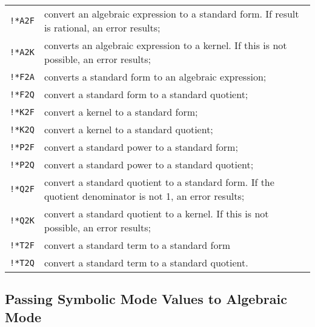 {\renewcommand{\arraystretch}{1.5}
\begin{tabular}{lp{\reduceboxwidth}}
\texttt{!*A2F} & convert an algebraic expression to
a standard form.  If result is rational, an error results; \\
%
\texttt{!*A2K} & converts an algebraic expression to
a kernel.  If this is not possible, an error results; \\
%
\texttt{!*F2A} & converts a standard form to an
algebraic expression; \\
%
\texttt{!*F2Q} & convert a standard form to a
standard quotient; \\
%
\texttt{!*K2F} & convert a kernel to a standard form; \\
\texttt{!*K2Q} & convert a kernel to a standard quotient; \\
%
\texttt{!*P2F} & convert a standard power to a
standard form; \\
%
\texttt{!*P2Q} & convert a standard power to a standard quotient; \\
%
\texttt{!*Q2F} & convert a standard quotient to a
standard form.  If the quotient denominator is not 1, an error results; \\
%
\texttt{!*Q2K} & convert a standard quotient to a
kernel.  If this is not possible, an error results; \\
%
\texttt{!*T2F} & convert a standard term to a standard form \\
%
\texttt{!*T2Q} & convert a standard term to a standard quotient.
\end{tabular}}

\subsection{Passing Symbolic Mode Values to Algebraic Mode}

